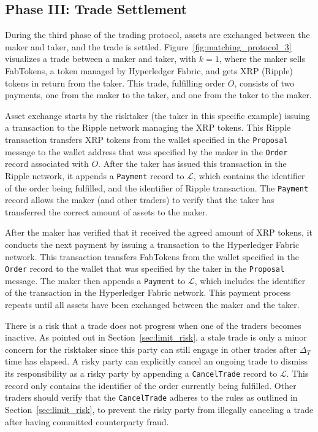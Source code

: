 \subsection*{Phase III: Trade Settlement}
\label{sec:phase_settlement}
During the third phase of the \ModelName{} trading protocol, assets are exchanged between the maker and taker, and the trade is settled.
Figure~\ref{fig:matching_protocol_3} visualizes a trade between a maker and taker, with $ k = 1 $, where the maker sells FabTokens, a token managed by Hyperledger Fabric, and gets XRP (Ripple) tokens in return from the taker.
This trade, fulfilling order $ O $, consists of two payments, one from the maker to the taker, and one from the taker to the maker.

Asset exchange starts by the risktaker (the taker in this specific example) issuing a transaction to the Ripple network managing the XRP tokens.
This Ripple transaction transfers XRP tokens from the wallet specified in the \texttt{Proposal} message to the wallet address that was specified by the maker in the \texttt{Order} record associated with $ O $.
After the taker has issued this transaction in the Ripple network, it appends a \texttt{Payment} record to $ \mathcal{L} $, which contains the identifier of the order being fulfilled, and the identifier of Ripple transaction.
The \texttt{Payment} record allows the maker (and other traders) to verify that the taker has transferred the correct amount of assets to the maker.

After the maker has verified that it received the agreed amount of XRP tokens, it conducts the next payment by issuing a transaction to the Hyperledger Fabric network.
This transaction transfers FabTokens from the wallet specified in the \texttt{Order} record to the wallet that was specified by the taker in the \texttt{Proposal} message.
The maker then appends a \texttt{Payment} to $ \mathcal{L} $, which includes the identifier of the transaction in the Hyperledger Fabric network.
This payment process repeats until all assets have been exchanged between the maker and the taker.

There is a risk that a trade does not progress when one of the traders becomes inactive.
As pointed out in Section~\ref{sec:limit_risk}, a stale trade is only a minor concern for the risktaker since this party can still engage in other trades after $ \Delta_T $ time has elapsed.
A risky party can explicitly cancel an ongoing trade to dismiss its responsibility as a risky party by appending a \texttt{CancelTrade} record to $ \mathcal{L} $.
This record only contains the identifier of the order currently being fulfilled.
Other traders should verify that the \texttt{CancelTrade} adheres to the rules as outlined in Section~\ref{sec:limit_risk}, to prevent the risky party from illegally canceling a trade after having committed counterparty fraud.

